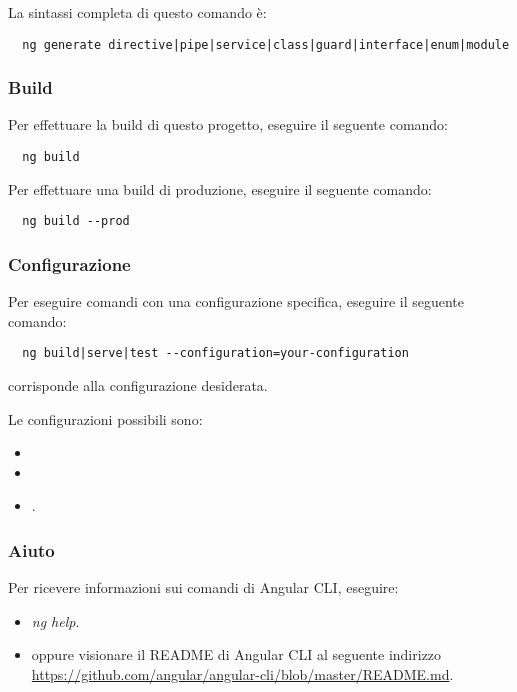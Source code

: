 \documentclass[../../manuale-manutentore.tex]{subfiles}
\begin{document}
La sintassi completa di questo comando è:

\begin{verbatim}
  ng generate directive|pipe|service|class|guard|interface|enum|module
\end{verbatim}

\subsubsection{Build}%
\label{subs:build}

Per effettuare la build di questo progetto, eseguire il seguente comando:

\begin{verbatim}
  ng build
\end{verbatim}

Per effettuare una build di produzione, eseguire il seguente comando:

\begin{verbatim}
  ng build --prod
\end{verbatim}

\subsubsection{Configurazione}%
\label{subs:configurazione}

Per eseguire comandi con una configurazione specifica, eseguire il seguente comando:

\begin{verbatim}
  ng build|serve|test --configuration=your-configuration
\end{verbatim}

 corrisponde alla configurazione desiderata.

Le configurazioni possibili sono:
\begin{itemize}
  \item {}
  \item {}
  \item {}.
\end{itemize}

\subsubsection{Aiuto}%
\label{subs:aiuto}

Per ricevere informazioni sui comandi di Angular CLI, eseguire:
\begin{itemize}
  \item \textit{ng help}.
  \item oppure visionare il README di Angular CLI al seguente indirizzo \href{https://github.com/angular/angular-cli/blob/master/README.md}{https://github.com/angular/angular-cli/blob/master/README.md}.
\end{itemize}
\end{document}
